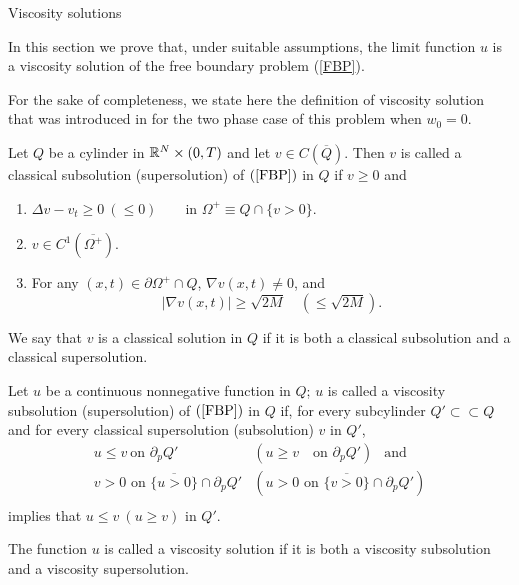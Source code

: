 \bigskip

\begin{section}{Viscosity solutions}
\setcounter{equation}{0}

In this section we prove that, under suitable assumptions, the limit function $u$ is a viscosity solution 
of the free boundary problem (\ref{FBP}).

For the sake of completeness, we state here the definition of viscosity 
solution that was introduced in \cite{CLW2} for the two phase case of this 
problem when $w_0=0$.


\begin{defi}
Let $Q$ be a cylinder in ${\Bbb R}^N\times (0,T)$ and let $v\in C(\overline{Q})$. 
Then $v$ is called a classical subsolution (supersolution) of $(\ref{FBP})$
in $Q$ if $v\ge0$ 
and
\begin{enumerate}
\item $\Delta v - v_t \ge 0\ (\le 0)\qquad \mbox{in } \Omega^+ \equiv 
Q\cap\{ v>0 \}$.
\item $v\in C^1(\overline{\Omega^+})$.
\item For any $(x,t)\in \partial\Omega^+\cap Q$, $\nabla v(x,t)\ne 0$, and
$$|\nabla v(x,t)|\ge \sqrt{2M}\quad (\le \sqrt{2M}).$$
\end{enumerate}

We say that $v$ is a classical solution in $Q$ if it is both a classical 
subsolution and a classical supersolution.
\end{defi}


\begin{defi}
Let $u$ be a continuous nonnegative function in $Q$; $u$ is called a 
viscosity subsolution (supersolution) of $(\ref{FBP})$ in $Q$ if, for every subcylinder 
$Q'\subset\subset Q$ and for every classical supersolution (subsolution) 
$v$ in $Q'$, 
$$\begin{array}{ll}
u\le v \ \mbox{on }\partial_p Q'  & (u\ge v\quad \mbox{on } \partial_p Q')\ \ \mbox{ and }\\
v>0 \mbox{ on } \overline{\{ u>0 \}}\cap \partial_p Q' &
(u>0 \mbox{ on } \overline{\{ v>0 \}}\cap \partial_p Q')\\
\end{array}$$
implies that $u\le v\ (u\ge v)$ in $Q'$.

The function $u$ is called a viscosity solution if it is both a viscosity 
subsolution and a viscosity supersolution.
\end{defi}

\medskip


\end{section}

